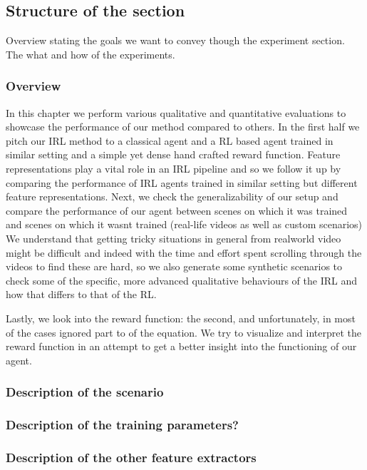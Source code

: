 \subsection{Structure of the section}
Overview stating the goals we want to convey though the experiment section. The what and how of the experiments.
\subsubsection*{Overview}
In this chapter we perform various qualitative and quantitative evaluations to showcase the performance of our method compared to others. In the first half we pitch our IRL method to a classical agent and a RL based agent trained in similar setting and a simple yet dense hand crafted reward function. Feature representations play a vital role in an IRL pipeline and so we follow it up by comparing the performance of IRL agents trained in similar setting but different feature representations.
Next, we check the generalizability of our setup and compare the performance of our agent between scenes on which it was trained and scenes on which it wasnt trained (real-life videos as well as custom scenarios)
We understand that getting tricky situations in general from realworld video might be difficult and indeed with the time and effort spent scrolling through the videos to find these are hard, so we also generate some synthetic scenarios to check some of the specific, more advanced qualitative behaviours of the IRL and how that differs to that of the RL.

Lastly, we look into the reward function: the second, and unfortunately, in most of the cases ignored part to of the equation. We try to visualize and interpret the reward function in an attempt to get a better insight into the functioning of our agent.

\subsubsection*{Description of the scenario}

\subsubsection*{Description of the training parameters?}

\subsubsection*{Description of the other feature extractors}
